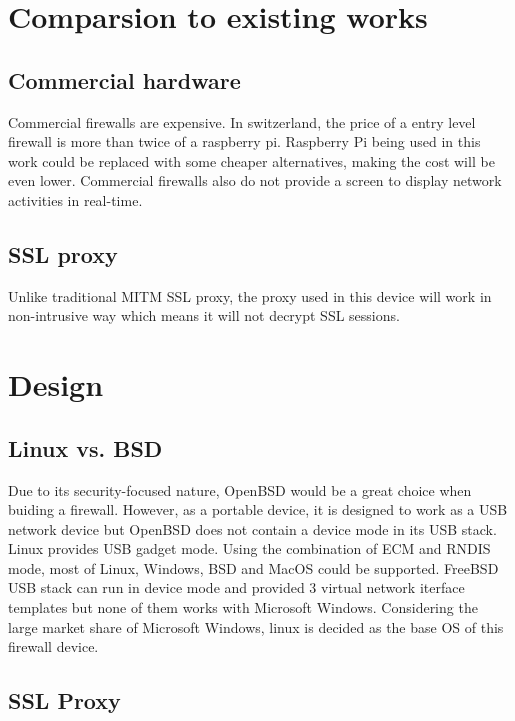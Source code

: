 \documentclass[mscthesis]{usiinfthesis}
\begin{document}
\chapter{Comparsion to existing works}
\section{Commercial hardware}
Commercial firewalls are expensive. In switzerland, the price of a entry
level firewall is more than twice of a raspberry pi. Raspberry Pi being
used in this work could be replaced with some cheaper alternatives, making
the cost will be even lower. Commercial firewalls also do not provide a
screen to display network activities in real-time.

\section{SSL proxy}
Unlike traditional MITM SSL proxy, the proxy used in this device will work
in non-intrusive way which means it will not decrypt SSL sessions.

\chapter[Design]{Design}

\section{Linux vs. BSD}

Due to its security-focused nature, OpenBSD would be a great choice when buiding a firewall. However, as a portable device, it is designed to work as a USB network device but OpenBSD does not contain a device mode in its USB stack. Linux provides USB gadget mode. Using the combination of ECM and RNDIS mode, most of Linux, Windows, BSD and MacOS could be supported. FreeBSD USB stack can run in device mode and provided 3 virtual network iterface templates but none of them works with Microsoft Windows\citet{freebsdhb:usb}. Considering the large market share of Microsoft Windows, linux is decided as the base OS of this firewall device.

\section{SSL Proxy}
\end{document}
